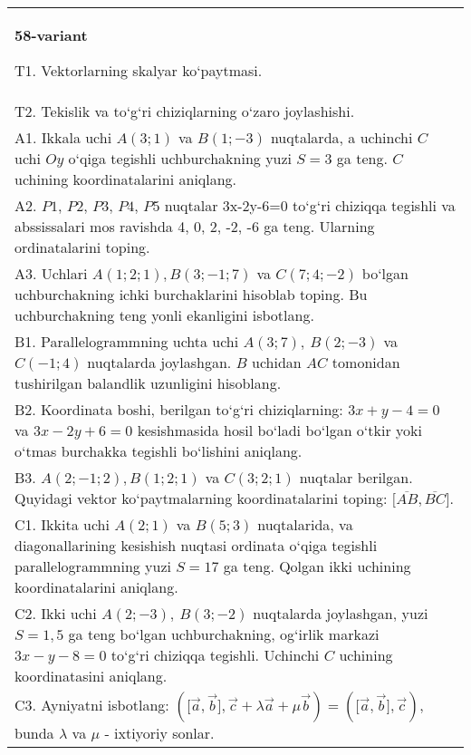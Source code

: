 \documentclass{article}
\begin{document}
\begin{tabular}{m{17cm}}
\textbf{58-variant}
\newline

T1. 
Vektorlarning skalyar ko‘paytmasi.
 \\
T2. 
Tekislik va to‘g‘ri chiziqlarning o‘zaro joylashishi.
 \\
A1. 
Ikkala uchi $A (3;1) $ va $B (1;-3) $ nuqtalarda, a
uchinchi $C$ uchi $Oy$ o‘qiga tegishli uchburchakning
yuzi $S=3$ ga teng. $C$ uchining koordinatalarini aniqlang.
 \\
A2. 
$P1$, $P2$, $P3$, $P4$, $P5$ nuqtalar
3x-2y-6=0 to‘g‘ri chiziqqa tegishli va abssissalari mos ravishda
4, 0, 2, -2, -6 ga teng. Ularning ordinatalarini toping.
 \\
A3. 
Uchlari $A (1;2;1), B (3;-1;7) $ va $C (7;4;-2) $ bo‘lgan uchburchakning
ichki burchaklarini hisoblab toping. Bu uchburchakning teng yonli ekanligini isbotlang.
 \\
B1. 
Parallelogrammning uchta uchi \(A (3;7),\ B (2;-3) \) va
\(C (-1;4) \) nuqtalarda joylashgan. $B$ uchidan $AC$
tomonidan tushirilgan balandlik uzunligini hisoblang.
 \\
B2. 
Koordinata boshi, berilgan to‘g‘ri chiziqlarning:
\(3x+y-4=0\) va \(3x-2y+6=0\) kesishmasida hosil bo‘ladi
bo‘lgan o‘tkir yoki o‘tmas burchakka tegishli bo‘lishini aniqlang.
 \\
B3. 
$A (2; -1;2),B (1;2; 1) $ va $C (3;2;1)$ nuqtalar berilgan. Quyidagi vektor ko‘paytmalarning koordinatalarini toping:
$\lbrack\overline{AB},\overline{BC}\rbrack$.
 \\
C1. 
Ikkita uchi \(A (2;1) \) va \(B (5; 3) \) nuqtalarida, va
diagonallarining kesishish nuqtasi ordinata o‘qiga tegishli
parallelogrammning yuzi \(S = 17\) ga teng. Qolgan ikki uchining
koordinatalarini aniqlang. \\
C2. 
Ikki uchi \(A (2; - 3),\ B (3; - 2) \) nuqtalarda
joylashgan, yuzi \(S = 1,5\) ga teng bo‘lgan uchburchakning,
og‘irlik markazi \(3x - y - 8 = 0\) to‘g‘ri chiziqqa tegishli. Uchinchi $C$
uchining koordinatasini aniqlang.
 \\
C3. 
Ayniyatni isbotlang: \((\lbrack\vec{a},\vec{b}\rbrack,\vec{c} + \lambda\vec{a} + \mu\vec{b}) = (\lbrack\vec{a},\vec{b}\rbrack,\vec{c}) \), bunda \(\lambda\) va \(\mu\) - ixtiyoriy sonlar. \\

\end{tabular}
\vspace{1cm}
\end{document}
